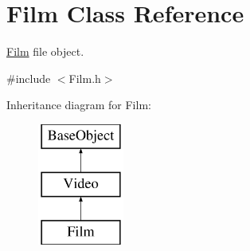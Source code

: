 \hypertarget{classFilm}{\section{Film Class Reference}
\label{classFilm}
}


\hyperlink{classFilm}{Film} file object.  




{\ttfamily \#include $<$Film.\+h$>$}

Inheritance diagram for Film\+:\begin{figure}[H]
\begin{center}
\leavevmode
\includegraphics[height=4.000000cm]{classFilm}
\end{center}
\end{figure}
